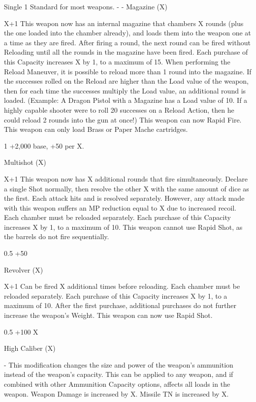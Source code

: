 \documentclass[oneside,11pt,english]{book}
\begin{document}
Single 1 Standard for most weapons. - - 
Magazine 
(X) 

X+1 This weapon now has an internal magazine that chambers X rounds (plus the one 
loaded into the chamber already), and loads them into the weapon one at a time as 
they are fired. 
After firing a round, the next round can be fired without Reloading until all the 
rounds in the magazine have been fired. Each purchase of this Capacity increases X 
by 1, to a maximum of 15. 
When performing the Reload Maneuver, it is possible to reload more than 1 round 
into the magazine. If the successes rolled on the Reload are higher than the Load 
value of the weapon, then for each time the successes multiply the Load value, an 
additional round is loaded. (Example: A Dragon Pistol with a Magazine has a Load 
value of 10. If a highly capable shooter were to roll 20 successes on a Reload 
Action, then he could reload 2 rounds into the gun at once!) 
This weapon can now Rapid Fire. 
This weapon can only load Brass or Paper Mache cartridges. 

 

1 +2,000%
base, +50%
per X. 

Multishot 
(X) 

X+1 This weapon now has X additional rounds that fire simultaneously. Declare a single 
Shot normally, then resolve the other X with the same amount of dice as the first. 
Each attack hits and is resolved separately. However, any attack made with this 
weapon suffers an MP reduction equal to X due to increased recoil. Each chamber 
must be reloaded separately. Each purchase of this Capacity increases X by 1, to a 
maximum of 10. 
This weapon cannot use Rapid Shot, as the barrels do not fire sequentially. 

0.5 +50%

Revolver 
(X) 

X+1 Can be fired X additional times before reloading. Each chamber must be reloaded 
separately. Each purchase of this Capacity increases X by 1, to a maximum of 10. 
After the first purchase, additional purchases do not further increase the weapon’s 
Weight. 
This weapon can now use Rapid Shot. 

0.5 +100%
X 

High 
Caliber 
(X) 

- This modification changes the size and power of the weapon’s ammunition instead of 
the weapon’s capacity. This can be applied to any weapon, and if combined with 
other Ammunition Capacity options, affects all loads in the weapon. 
Weapon Damage is increased by X. Missile TN is increased by X. 
\end{document}
